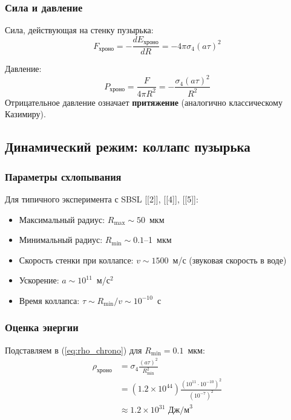 \documentclass[12pt,a4paper]{article}
\begin{document}
\subsubsection{Сила и давление}

Сила, действующая на стенку пузырька:
\begin{equation}
F_{\text{хроно}} = -\frac{dE_{\text{хроно}}}{dR} = -4\pi \sigma_4 (a\tau)^2
\end{equation}

Давление:
\begin{equation}
P_{\text{хроно}} = \frac{F}{4\pi R^2} = -\frac{\sigma_4 (a\tau)^2}{R^2}
\end{equation}
Отрицательное давление означает \textbf{притяжение} (аналогично классическому Казимиру).

\subsection{Динамический режим: коллапс пузырька}

\subsubsection{Параметры схлопывания}

Для типичного эксперимента с SBSL [[2]], [[4]], [[5]]:
\begin{itemize}
    \item Максимальный радиус: $R_{\text{max}} \sim 50$~мкм
    \item Минимальный радиус: $R_{\text{min}} \sim 0.1$--1~мкм
    \item Скорость стенки при коллапсе: $v \sim 1500$~м/с (звуковая скорость в воде)
    \item Ускорение: $a \sim 10^{11}$~м/с$^2$
    \item Время коллапса: $\tau \sim R_{\text{min}}/v \sim 10^{-10}$~с
\end{itemize}

\subsubsection{Оценка энергии}

Подставляем в (\ref{eq:rho_chrono}) для $R_{\text{min}} = 0.1$~мкм:
\begin{align}
\rho_{\text{хроно}} &= \sigma_4 \frac{(a\tau)^2}{R_{\text{min}}^2} \nonumber \\
&= (1.2 \times 10^{44}) \frac{(10^{11} \cdot 10^{-10})^2}{(10^{-7})^2} \nonumber \\
&\approx 1.2 \times 10^{31} \text{ Дж/м}^3
\end{align}
\end{document}
